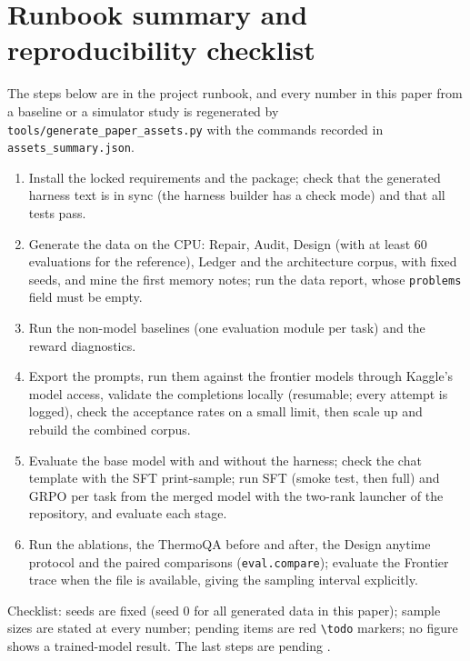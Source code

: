 \section{Runbook summary and reproducibility checklist}\label{app:runbook}

The steps below are in the project runbook, and every number in this paper from a baseline or a simulator study is regenerated by \texttt{tools/generate\_paper\_assets.py} with the commands recorded in \texttt{assets\_summary.json}.
\begin{enumerate}[leftmargin=*,itemsep=1pt]
\item Install the locked requirements and the package; check that the generated harness text is in sync (the harness builder has a check mode) and that all  tests pass.
\item Generate the data on the CPU: Repair, Audit, Design (with at least 60 evaluations for the reference), Ledger and the architecture corpus, with fixed seeds, and mine the first memory notes; run the data report, whose \texttt{problems} field must be empty.
\item Run the non-model baselines (one evaluation module per task) and the reward diagnostics.
\item Export the prompts, run them against the frontier models through Kaggle's model access, validate the completions locally (resumable; every attempt is logged), check the acceptance rates on a small limit, then scale up and rebuild the combined corpus.
\item Evaluate the base model with and without the harness; check the chat template with the SFT print-sample; run SFT (smoke test, then full) and GRPO per task from the merged model with the two-rank launcher of the repository, and evaluate each stage.
\item Run the ablations, the ThermoQA before and after, the Design anytime protocol and the paired comparisons (\texttt{eval.compare}); evaluate the Frontier trace when the file is available, giving the sampling interval explicitly.
\end{enumerate}
Checklist: seeds are fixed (seed 0 for all generated data in this paper); sample sizes are stated at every number; pending items are red \texttt{\textbackslash todo} markers; no figure shows a trained-model result. The last steps are pending .
